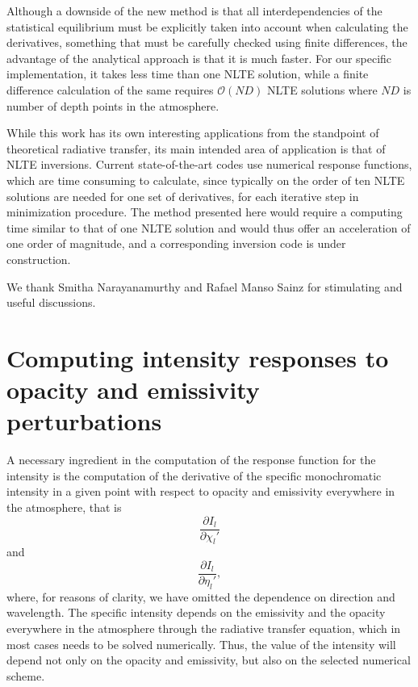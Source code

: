 \documentclass[referee]{aa}
\begin{document}
Although a downside of the new method is that all interdependencies of the statistical equilibrium must be explicitly taken into account when calculating the derivatives, something that must be carefully checked using finite differences, the advantage of the analytical approach is that it is much faster. For our specific implementation, it takes less time than one NLTE solution, while a finite difference calculation of the same requires ${\mathcal O}(ND)$ NLTE solutions where $ND$ is number of depth points in the atmosphere. 

While this work has its own interesting applications from the standpoint of theoretical radiative transfer, its main intended area of application is that of NLTE inversions. Current state-of-the-art codes use numerical response functions, which are time consuming to calculate, since typically on the order of ten NLTE solutions are needed for one set of derivatives, for each iterative step in minimization procedure. The method presented here would require a computing time similar to that of one NLTE solution and would thus offer an acceleration of one order of magnitude, and a corresponding inversion code is under construction.


\begin{acknowledgements}
 We thank Smitha Narayanamurthy and Rafael Manso Sainz for stimulating and useful discussions. 
\end{acknowledgements}

\appendix
\section{Computing intensity responses to opacity and emissivity perturbations}
\label{Appendix_A}

A necessary ingredient in the computation of the response function for the intensity is the computation of the derivative of the specific monochromatic intensity in a given point with respect to opacity and emissivity everywhere in the atmosphere, that is
$$\frac{\partial I_l}{\partial \chi_l'}$$ 
and 
$$\frac{\partial I_l}{\partial \eta_l'},$$ 
where, for reasons of clarity, we have omitted the dependence on direction and wavelength. The specific intensity depends on the emissivity and the opacity everywhere in the atmosphere through the radiative transfer equation, which in most cases needs to be solved numerically. Thus, the value of the intensity will depend not only on the opacity and emissivity, but also on the selected numerical scheme. 
\end{document}
